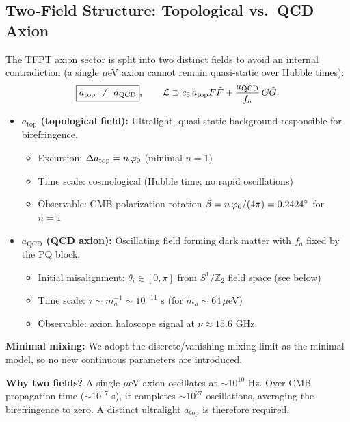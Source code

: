 \subsection{Two-Field Structure: Topological vs.\ QCD Axion}

The TFPT axion sector is split into two distinct fields to avoid an internal
contradiction (a single $\mu$eV axion cannot remain quasi-static over Hubble times):
\begin{equation}
    \boxed{a_{\text{top}} \;\neq\; a_{\text{QCD}}},
    \qquad
    \mathcal{L} \supset c_3\, a_{\text{top}} F\tilde{F}
    + \frac{a_{\text{QCD}}}{f_a}\,G\tilde{G}.
\end{equation}

\begin{tcolorbox}[colback=orange!5, colframe=orange!60!black, 
    title={\textbf{Two-Field Axion Structure}}, fonttitle=\bfseries]
\begin{itemize}[leftmargin=1.5em, topsep=2pt, itemsep=2pt]
    \item \textbf{$a_{\text{top}}$ (topological field):} Ultralight, quasi-static background
        responsible for birefringence.
        \begin{itemize}[leftmargin=1em, topsep=1pt]
            \item Excursion: $\Delta a_{\text{top}} = n\,\varphi_0$ (minimal $n=1$)
            \item Time scale: cosmological (Hubble time; no rapid oscillations)
            \item Observable: CMB polarization rotation $\beta = n\,\varphi_0/(4\pi) = 0.2424^\circ$ for $n=1$
        \end{itemize}
    \item \textbf{$a_{\text{QCD}}$ (QCD axion):} Oscillating field forming dark matter with
        $f_a$ fixed by the PQ block.
        \begin{itemize}[leftmargin=1em, topsep=1pt]
            \item Initial misalignment: $\theta_i \in [0,\pi]$ from $S^1/\mathbb{Z}_2$ field space (see below)
            \item Time scale: $\tau \sim m_a^{-1} \sim 10^{-11}$ s (for $m_a \sim 64\,\mu$eV)
            \item Observable: axion haloscope signal at $\nu \approx 15.6$ GHz
        \end{itemize}
\end{itemize}

\textbf{Minimal mixing:} We adopt the discrete/vanishing mixing limit as the minimal model,
so no new continuous parameters are introduced.
\end{tcolorbox}
\textbf{Why two fields?} A single $\mu$eV axion oscillates at $\sim 10^{10}$ Hz. Over CMB 
propagation time ($\sim 10^{17}$ s), it completes $\sim 10^{27}$ oscillations, averaging 
the birefringence to zero. A distinct ultralight $a_{\text{top}}$ is therefore required.

